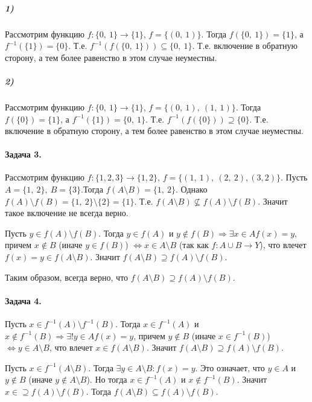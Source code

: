 \documentclass{article}
\begin{document}
		\subparagraph{1)}
		 Рассмотрим функцию $f: \{0,\ 1\} \rightarrow \{1\}$, $f = \{(0,\ 1)\}$.
		 Тогда $f(\{0,\ 1\}) = \{1\}$, а $f^{-1}(\{1\}) = \{0\}$. Т.е. $f^{-1}(f(\{0,\ 1\})) \subseteq \{0,\ 1\}$. Т.е. включение в обратную сторону, а тем более равенство в этом случае неуместны.
		
		\subparagraph{2)}
		Рассмотрим функцию $f: \{0,\ 1\} \rightarrow \{1\}$, $f = \{(0,\ 1),\ (1,\ 1)\}$. 
		Тогда $f(\{0 \}) = \{1 \} $, а $f^{-1}(\{1\}) = \{0,\ 1\} $. Т.е. $f^{-1}(f(\{0\})) \supseteq \{0\} $. Т.е. включение в обратную сторону, а тем более равенство в этом случае неуместны.
		
		\paragraph{Задача 3.}
	    Рассмотрим функцию $f: \{1, 2, 3\} \rightarrow \{1, 2\}$, $f = \{(1,\ 1),\ (2,\ 2), (3, 2)\}$. Пусть $A = \{1,\ 2\},\ B = \{3\}$.Тогда $f(A \setminus B) = \{1,\ 2\}$. Однако $f(A) \setminus f(B) = \{1,\ 2\} \setminus \{2\} = \{1\}$. Т.е. $f(A \setminus B) \not\subseteq f(A) \setminus f(B)$. Значит такое включение не всегда верно.
	    
	    Пусть $y \in f(A) \setminus f(B)$. Тогда $y \in f(A)$ и $y \notin f(B) \Rightarrow \exists x \in A f(x) = y$, причем $x \notin B$ (иначе $y \in f(B)$) $\Leftrightarrow x \in A \setminus B$ (так как $f: A \cup B \rightarrow Y$), что влечет $f(x) = y \in f(A \setminus B)$. Значит $f(A \setminus B) \supseteq f(A) \setminus f(B)$.
	    
	    Таким образом, всегда верно, что $f(A \setminus B) \supseteq f(A) \setminus f(B)$.
	    
	    \paragraph{Задача 4.}
		Пусть $x \in f^{-1}(A) \setminus f^{-1}(B)$. Тогда $x \in f^{-1}(A)$ и $x \notin f^{-1}(B) \Rightarrow \exists! y \in A f(x) = y$, причем $y \notin B$ (иначе $x \in f^{-1}(B)$) $\Leftrightarrow y \in A \setminus B$, что влечет $x \in f(A \setminus B)$. Значит $f(A \setminus B) \supseteq f(A) \setminus f(B)$.
		
		Пусть $x \in f^{-1}(A \setminus B)$. Тогда $\exists y \in A \setminus B: f(x) = y$. Это означает, что $y \in A$ и $y \notin B$ (иначе $y \notin A \setminus B$). Но тогда $x \in f^{-1}(A)$ и $x \notin f^{-1}(B)$. Значит $x \in \supseteq f(A) \setminus f(B)$. Тогда $f(A \setminus B) \subseteq f(A) \setminus f(B)$.
		
\end{document}
